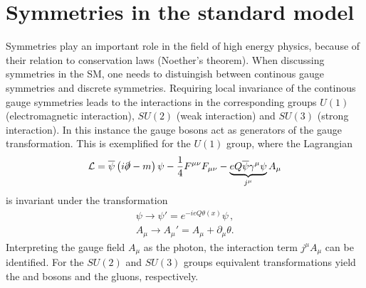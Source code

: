 \section{Symmetries in the standard model}
\label{sec:symmetriesInSM}

Symmetries play an important role in the field of high energy physics, \eg because of their relation to conservation laws (Noether's theorem).
When discussing symmetries in the \ac{SM}, one needs to distuingish between continous gauge symmetries and discrete symmetries.
Requiring local invariance of the continous gauge symmetries leads to the interactions in the corresponding groups $U(1)$ (electromagnetic interaction), $SU(2)$ (weak interaction) and $SU(3)$ (strong interaction).
In this instance the gauge bosons act as generators of the gauge transformation.
This is exemplified for the $U(1)$ group, where the Lagrangian
\begin{equation}
\mathcal{L}=\overline{\psi}\left(i\slashed{\partial} - m\right)\psi
- \frac{1}{4}F^{\mu\nu}F_{\mu\nu} - \underbrace{eQ\overline{\psi}\gamma^{\mu}\psi}_{j^{\mu}}A_{\mu}
\end{equation}
is invariant under the transformation
\begin{align}
\psi\rightarrow\psi'=e^{-ieQ\theta\left(x\right)}\psi\,,\\
A_\mu\rightarrow A_\mu'=A_\mu+\partial_\mu\theta.
\end{align}
Interpreting the gauge field $A_\mu$ as the photon, the interaction term $j^\mu A_\mu$ can be identified.
For the $SU(2)$ and $SU(3)$ groups equivalent transformations yield the \Wpm and \Z bosons and the gluons, respectively.

